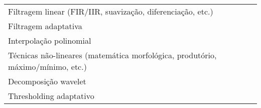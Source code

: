 \begin{tabular}{p{140pt}p{280pt}}
    \toprule
    Filtragem linear (FIR/IIR, suavização, diferenciação, etc.) &
    \cite{Chen2006, Elgendi2013, Okada1979, Pan1985, Daskalov1998}\\
    Filtragem adaptativa &
    \cite{Park1998}\\
    Interpolação polinomial &
    \cite{Badilini1991}\\
    Técnicas não-lineares (matemática morfológica, produtório, máximo/mínimo, etc.) &
    \cite{Chu1989, Okada1979, Sun2005, Suppappola1994, Trahanias1993, Pan1985}\\
    Decomposição wavelet &
    \cite{Chen2006, Park1998}\\
    Thresholding adaptativo &
    \cite{Chen2006, Elgendi2013, Sun2005, Pan1985}\\
    \bottomrule
\end{tabular}